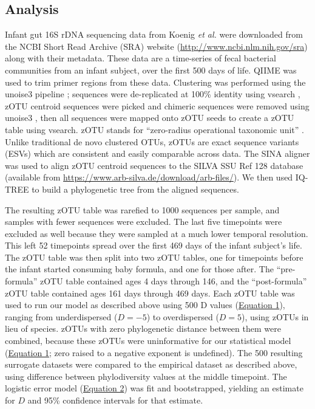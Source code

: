 \documentclass{article}
\begin{document}
\subsection{Analysis} \label{sec:analysis}
Infant gut 16S rDNA sequencing data from Koenig \emph{et al.} \cite{Koenig2011} were downloaded from the NCBI Short Read Archive (SRA) website (\url{http://www.ncbi.nlm.nih.gov/sra}) along with their metadata. These data are a time-series of fecal bacterial communities from an infant subject, over the first 500 days of life. QIIME \cite{Caporaso2010} was used to trim primer regions from these data. Clustering was performed using the unoise3 pipeline \cite{Edgar2016}; sequences were de-replicated at 100\% identity using vsearch \cite{Rognes2016}, zOTU centroid sequences were picked and chimeric sequences were removed using unoise3 \cite{Edgar2016}, then all sequences were mapped onto zOTU seeds to create a zOTU table using vsearch. zOTU stands for “zero-radius operational taxonomic unit” \cite{Edgar2016}. Unlike traditional de novo clustered OTUs, zOTUs are exact sequence variants (ESVs) which are consistent and easily comparable across data. The SINA aligner \cite{Pruesse2012} was used to align zOTU centroid sequences to the SILVA SSU Ref 128 database (available from \url{https://www.arb-silva.de/download/arb-files/}). We then used IQ-TREE \cite{Nguyen2015} to build a phylogenetic tree from the aligned sequences.
\par
The resulting zOTU table was rarefied to 1000 sequences per sample, and samples with fewer sequences were excluded. The last five timepoints were excluded as well because they were sampled at a much lower temporal resolution. This left 52 timepoints spread over the first 469 days of the infant subject's life. The zOTU table was then split into two zOTU tables, one for timepoints before the infant started consuming baby formula, and one for those after. The “pre-formula” zOTU table contained ages 4 days through 146, and the “post-formula” zOTU table contained ages 161 days through 469 days. Each zOTU table was used to run our model as described above using 500 D values (\hyperref[sec:equation1]{Equation 1}), ranging from underdispersed (\(D = -5\)) to overdispersed (\(D = 5\)), using zOTUs in lieu of species. zOTUs with zero phylogenetic distance between them were combined, because these zOTUs were uninformative for our statistical model (\hyperref[sec:equation1]{Equation 1}; zero raised to a negative exponent is undefined). The 500 resulting surrogate datasets were compared to the empirical dataset as described above, using difference between phylodiversity values at the middle timepoint. The logistic error model (\hyperref[sec:equation2]{Equation 2}) was fit and bootstrapped, yielding an estimate for \(D\) and 95\% confidence intervals for that estimate.
\end{document}
